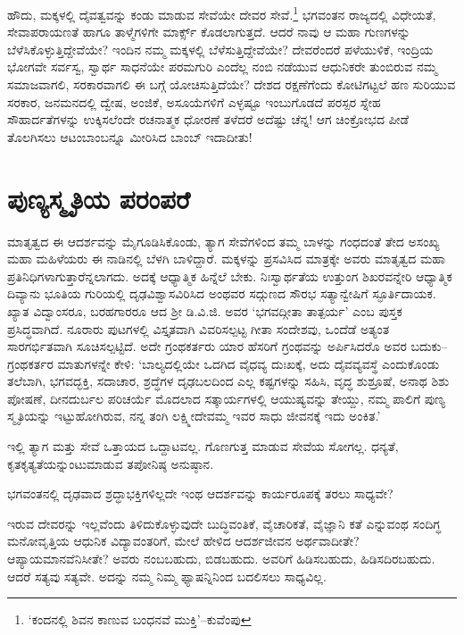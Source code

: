 ಹೌದು, ಮಕ್ಕಳಲ್ಲಿ ದೈವತ್ವವನ್ನು ಕಂಡು ಮಾಡುವ ಸೇವೆಯೇ ದೇವರ ಸೇವೆ.\footnote{ ‘ಕಂದನಲ್ಲಿ ಶಿವನ ಕಾಣುವ ಬಂಧನವೆ ಮುಕ್ತಿ’–ಕುವೆಂಪು} ಭಗವಂತನ ರಾಜ್ಯದಲ್ಲಿ ವಿಧೇಯತೆ, ಸೇವಾಪರಾಯಣತೆ ಹಾಗೂ ತಾಳ್ಮೆಗಳಿಗೇ ಮಾರ್ಕ್ಸ್ ಕೊಡಲಾಗುತ್ತದೆ. ಆದರೆ ನಾವು ಆ ಮಹಾ ಗುಣಗಳನ್ನು ಬೆಳೆಸಿಕೊಳ್ಳುತ್ತಿದ್ದೇವೆಯೇ? ಇಂದಿನ ನಮ್ಮ ಮಕ್ಕಳಲ್ಲಿ ಬೆಳೆಸುತ್ತಿದ್ದೇವೆಯೇ? ದೇವರೆಂದರೆ ಪಳೆಯುಳಿಕೆ, ಇಂದ್ರಿಯ ಭೋಗವೇ ಸರ್ವಸ್ವ, ಸ್ವಾರ್ಥ ಸಾಧನೆಯೇ ಪರಮಗುರಿ ಎಂದೆಲ್ಲ ನಂಬಿ ನಡೆಯುವ ಆಧುನಿಕರೇ ತುಂಬಿರುವ ನಮ್ಮ ಸಮಾಜ\-ವಾಗಲಿ, ಸರಕಾರವಾಗಲಿ ಈ ಬಗ್ಗೆ ಯೋಚಿಸುತ್ತಿದೆಯೇ? ದೇಶದ ರಕ್ಷಣೆಗೆಂದು ಕೋಟಿಗಟ್ಟಲೆ ಹಣ ಸುರಿಯುವ ಸರಕಾರ, ಜನಮನದಲ್ಲಿ ದ್ವೇಷ, ಅಂಜಿಕೆ, ಅಸೂಯೆಗಳಿಗೆ ಎಳ್ಳಷ್ಟೂ ಇಂಬು\-ಗೊಡದೆ ಪರಸ್ಪರ ಸ್ನೇಹ ಸೌಹಾರ್ದತೆಗಳನ್ನು ಉಕ್ಕಿಸಲೆಂದೇ ರಚನಾತ್ಮಕ ಧೋರಣೆ ತಳೆದರೆ ಅದೆಷ್ಟು ಚೆನ್ನ! ಆಗ ಚಿಂಕ್ರೋಭದ ಪೀಡೆ ತೊಲಗಿಸಲು ಆಟಂಬಾಂಬನ್ನೂ ಮೀರಿಸಿದ ಬಾಂಬ್ ಇದಾದೀತು!


\section*{ಪುಣ್ಯಸ್ಮೃತಿಯ ಪರಂಪರೆ}


ಮಾತೃತ್ವದ ಈ ಆದರ್ಶವನ್ನು ಮೈಗೂಡಿಸಿಕೊಂಡು, ತ್ಯಾಗ ಸೇವೆಗಳಿಂದ ತಮ್ಮ ಬಾಳನ್ನು ಗಂಧದಂತೆ ತೇದ ಅಸಂಖ್ಯ ಮಹಾ ಮಹಿಳೆಯರು ಈ ನಾಡಿನಲ್ಲಿ ಬೆಳಗಿ ಬಾಳಿದ್ದಾರೆ. ಮಕ್ಕಳನ್ನು ಪ್ರಸವಿಸಿದ ಮಾತ್ರಕ್ಕೇ ಅವರು ಮಾತೃತ್ವದ ಮಹಾ ಪ್ರತಿನಿಧಿಗಳಾಗುತ್ತಾರೆನ್ನಲಾಗದು. ಅದಕ್ಕೆ ಆಧ್ಯಾತ್ಮಿಕ ಹಿನ್ನೆಲೆ ಬೇಕು. ನಿಃಸ್ವಾರ್ಥತೆಯ ಉತ್ತುಂಗ ಶಿಖರವನ್ನೇರಿ ಆಧ್ಯಾತ್ಮಿಕ ದಿವ್ಯಾನು ಭೂತಿಯ ಗುರಿಯಲ್ಲಿ ದೃಢವಿಶ್ವಾಸವಿರಿಸಿದ ಅಂಥವರ ಸದ್ಗುಣದ ಸೌರಭ ಸತ್ಯಾನ್ವೇಷಿಗೆ ಸ್ಫೂರ್ತಿ\-ದಾಯಕ. ಖ್ಯಾತ ವಿದ್ವಾಂಸರೂ, ಬರಹಗಾರರೂ ಆದ ಶ‍್ರೀ ಡಿ.ವಿ.ಜಿ. ಅವರ ‘ಭಗವದ್ಗೀತಾ ತಾತ್ಪರ್ಯ’ ಎಂಬ ಪುಸ್ತಕ ಪ್ರಸಿದ್ಧವಾಗಿದೆ. ನೂರಾರು ಪುಟಗಳಲ್ಲಿ ವಿಸ್ತೃತವಾಗಿ ವಿವರಿಸಲ್ಪಟ್ಟ ಗೀತಾ ಸಂದೇಶವು, ಒಂದೆಡೆ ಅತ್ಯಂತ ಸಾರಗರ್ಭಿತವಾಗಿ ಸೂಚಿಸಲ್ಪಟ್ಟಿದೆ. ಅದೇ ಗ್ರಂಥಕರ್ತರು ಯಾರ ಹೆಸರಿಗೆ ಗ್ರಂಥವನ್ನು ಅರ್ಪಿಸಿದರೊ ಅವರ ಬದುಕು–ಗ್ರಂಥಕರ್ತರ ಮಾತುಗಳನ್ನೇ ಕೇಳಿ: ‘ಬಾಲ್ಯದಲ್ಲಿಯೇ ಒದಗಿದ ವೈಧವ್ಯ ದುಃಖಕ್ಕೆ, ಅದು ದೈವವ್ಯವಸ್ಥೆ ಎಂದುಕೊಂಡು ತಲೆಬಾಗಿ, ಭಗವದ್ಭಕ್ತಿ, ಸದಾಚಾರ, ಶ್ರದ್ಧೆಗಳ ದೃಢಬಲದಿಂದ ಎಲ್ಲ ಕಷ್ಟಗಳನ್ನು ಸಹಿಸಿ, ವೃದ್ಧ ಶುಶ್ರೂಷೆ, ಅನಾಥ ಶಿಶು ಪೋಷಣೆ, ದೀನದುರ್ಬಲ ಪರಿಚರ್ಯೆ ಮೊದಲಾದ ಸತ್ಕಾರ್ಯಗಳಲ್ಲಿ ಆಯುಷ್ಯವನ್ನು ತೇಯ್ದು, ನಮ್ಮ ಪಾಲಿಗೆ ಪುಣ್ಯ ಸ್ಮೃತಿಯನ್ನು ಇಟ್ಟುಹೋಗಿರುವ, ನನ್ನ ತಂಗಿ ಲಕ್ಷ್ಮೀದೇವಮ್ಮ ಇವರ ಸಾಧು ಜೀವನಕ್ಕೆ ಇದು ಅಂಕಿತ.’

ಇಲ್ಲಿ ತ್ಯಾಗ ಮತ್ತು ಸೇವೆ ಒತ್ತಾಯದ ಒದ್ದಾಟವಲ್ಲ. ಗೊಣಗುತ್ತ ಮಾಡುವ ಸೇವೆಯ ಸೋಗಲ್ಲ. ಧನ್ಯತೆ, ಕೃತಕೃತ್ಯತೆಯನ್ನುಂಟುಮಾಡುವ ತಪೋನಿಷ್ಠ ಅನುಷ್ಠಾನ.

ಭಗವಂತನಲ್ಲಿ ದೃಢವಾದ ಶ್ರದ್ಧಾಭಕ್ತಿಗಳಿಲ್ಲದೇ ಇಂಥ ಆದರ್ಶವನ್ನು ಕಾರ್ಯರೂಪಕ್ಕೆ ತರಲು ಸಾಧ್ಯವೇ?

ಇರುವ ದೇವರನ್ನು ಇಲ್ಲವೆಂದು ತಿಳಿದುಕೊಳ್ಳುವುದೇ ಬುದ್ಧಿವಂತಿಕೆ, ವೈಚಾರಿಕತೆ, ವೈಜ್ಞಾನಿ ಕತೆ ಎನ್ನುವಂಥ ಸಂದಿಗ್ಧ ಮನೋವೃತ್ತಿಯ ಆಧುನಿಕ ವಿದ್ಯಾವಂತರಿಗೆ, ಮೇಲೆ ಹೇಳಿದ ಆದರ್ಶ\-ಜೀವನ ಅರ್ಥವಾದೀತೇ? ಆಪ್ಯಾಯಮಾನವೆನಿಸೀತೇ? ಅವರು ನಂಬಬಹುದು, ಬಿಡಬಹುದು. ಅವರಿಗೆ ಹಿಡಿಸಬಹುದು, ಹಿಡಿಸದಿರಬಹುದು. ಆದರೆ ಸತ್ಯವು ಸತ್ಯವೇ. ಅದನ್ನು ನಮ್ಮ ನಿಮ್ಮ ಫ್ಯಾಷನ್ನಿನಿಂದ ಬದಲಿಸಲು ಸಾಧ್ಯವಿಲ್ಲ.

